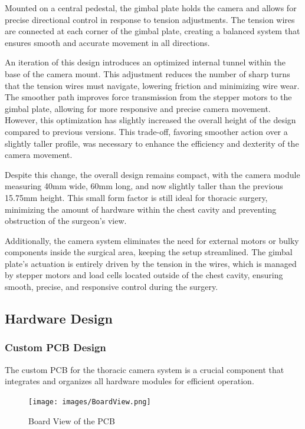 Mounted on a central pedestal, the gimbal plate holds the camera and allows for precise directional control in response to tension adjustments. The tension wires are connected at each corner of the gimbal plate, creating a balanced system that ensures smooth and accurate movement in all directions. 

An iteration of this design introduces an optimized internal tunnel within the base of the camera mount. This adjustment reduces the number of sharp turns that the tension wires must navigate, lowering friction and minimizing wire wear. The smoother path improves force transmission from the stepper motors to the gimbal plate, allowing for more responsive and precise camera movement. However, this optimization has slightly increased the overall height of the design compared to previous versions. This trade-off, favoring smoother action over a slightly taller profile, was necessary to enhance the efficiency and dexterity of the camera movement. 

Despite this change, the overall design remains compact, with the camera module measuring 40mm wide, 60mm long, and now slightly taller than the previous 15.75mm height. This small form factor is still ideal for thoracic surgery, minimizing the amount of hardware within the chest cavity and preventing obstruction of the surgeon’s view. 

Additionally, the camera system eliminates the need for external motors or bulky components inside the surgical area, keeping the setup streamlined. The gimbal plate’s actuation is entirely driven by the tension in the wires, which is managed by stepper motors and load cells located outside of the chest cavity, ensuring smooth, precise, and responsive control during the surgery. 



\subsection{Hardware Design}

\subsubsection{Custom PCB Design}
The custom PCB for the thoracic camera system is a crucial component that integrates and organizes all hardware modules for efficient operation.

\begin{figure}[H]
    \centering
    \texttt{[image: images/BoardView.png]}
    \caption{Board View of the PCB}
    \label{fig:BoardView}
\end{figure}

